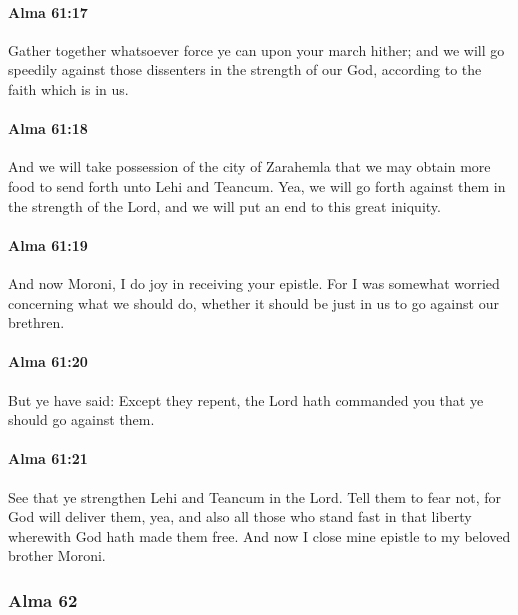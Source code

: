 		\paragraph{Alma 61:17} %
			\label{ALMA-61-17}

			Gather together whatsoever force ye can upon your march hither;
			and we will go speedily against those dissenters
			in the strength of our God, according to the faith which is in us.

		\paragraph{Alma 61:18} %
			\label{ALMA-61-18}

			And we will take possession of the city of Zarahemla
			that we may obtain more food to send forth unto Lehi and Teancum.
			Yea, we will go forth against them in the strength of the Lord,
			and we will put an end to this great iniquity.

		\paragraph{Alma 61:19} %
			\label{ALMA-61-19}

			And now Moroni, I do joy in receiving your epistle.
			For I was somewhat worried concerning what we should do,
			whether it should be just in us to go against our brethren.

		\paragraph{Alma 61:20} %
			\label{ALMA-61-20}

			But ye have said:
			Except they repent,
			the Lord hath commanded you
			that ye should go against them.

		\paragraph{Alma 61:21} %
			\label{ALMA-61-21}

			See that ye strengthen Lehi and Teancum in the Lord.
			Tell them to fear not,
			for God will deliver them,
			yea, and also all those who stand fast in that liberty
			wherewith God hath made them free.
			And now I close mine epistle to my beloved brother Moroni.

	\subsubsection{Alma 62} %
		\label{ALMA-62}
		
